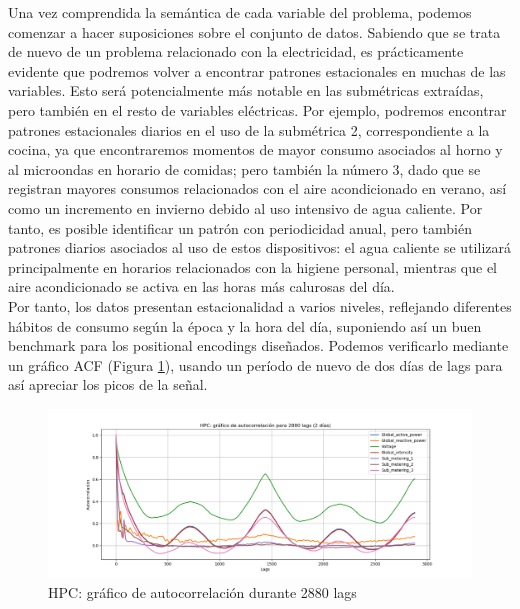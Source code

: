 Una vez comprendida la semántica de cada variable del problema, podemos comenzar a hacer suposiciones sobre el conjunto de datos. Sabiendo que se trata de nuevo de un problema relacionado con la electricidad, es prácticamente evidente que podremos volver a encontrar patrones estacionales en muchas de las variables. Esto será potencialmente más notable en las submétricas extraídas, pero también en el resto de variables eléctricas. Por ejemplo, podremos encontrar patrones estacionales diarios en el uso de la submétrica 2, correspondiente a la cocina, ya que encontraremos momentos de mayor consumo asociados al horno y al microondas en horario de comidas; pero también la número 3, dado que se registran mayores consumos relacionados con el aire acondicionado en verano, así como un incremento en invierno debido al uso intensivo de agua caliente. Por tanto, es posible identificar un patrón con periodicidad anual, pero también patrones diarios asociados al uso de estos dispositivos: el agua caliente se utilizará principalmente en horarios relacionados con la higiene personal, mientras que el aire acondicionado se activa en las horas más calurosas del día.\\

Por tanto, los datos presentan estacionalidad a varios niveles, reflejando diferentes hábitos de consumo según la época y la hora del día, suponiendo así un buen benchmark para los positional encodings diseñados. Podemos verificarlo mediante un gráfico ACF (Figura \ref{autohpc}), usando un período de nuevo de dos días de lags para así apreciar los picos de la señal.\\

\begin{figure}[!ht]
	\centering
	\includegraphics[scale=0.4]{img/hpc_autocorrelacion}
	\caption{HPC: gráfico de autocorrelación durante 2880 lags}
	\label{autohpc}
\end{figure}

